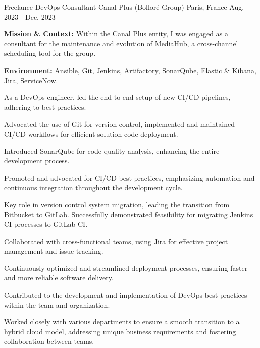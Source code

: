 \begin{cventries}
\cventry
{Freelance DevOps Consultant} %
{Canal Plus (Bolloré Group)} %
{Paris, France} %
{Aug. 2023 - Dec. 2023} %
{
  \begin{cvitems} %
    \item {\textbf{Mission \& Context:} Within the Canal Plus entity, I was engaged as a consultant for the maintenance and evolution of MediaHub, a cross-channel scheduling tool for the group.}
    \item {\textbf{Environment:} Ansible, Git, Jenkins, Artifactory, SonarQube, Elastic \& Kibana, Jira, ServiceNow.}
    \item {As a DevOps engineer, led the end-to-end setup of new CI/CD pipelines, adhering to best practices.}
    \item {Advocated the use of Git for version control, implemented and maintained CI/CD workflows for efficient solution code deployment.}
    \item {Introduced SonarQube for code quality analysis, enhancing the entire development process.}
    \item {Promoted and advocated for CI/CD best practices, emphasizing automation and continuous integration throughout the development cycle.}
    \item {Key role in version control system migration, leading the transition from Bitbucket to GitLab. Successfully demonstrated feasibility for migrating Jenkins CI processes to GitLab CI.}
    \item {Collaborated with cross-functional teams, using Jira for effective project management and issue tracking.}
    \item {Continuously optimized and streamlined deployment processes, ensuring faster and more reliable software delivery.}
    \item {Contributed to the development and implementation of DevOps best practices within the team and organization.}
    \item {Worked closely with various departments to ensure a smooth transition to a hybrid cloud model, addressing unique business requirements and fostering collaboration between teams.}
  \end{cvitems}        
}


\end{cventries}
